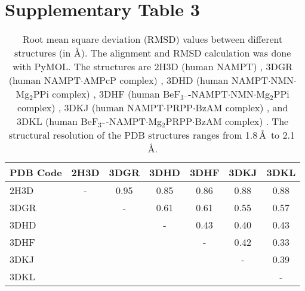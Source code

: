 \documentclass[a4paper,10pt]{article}
\begin{document}
\setcounter{table}{2}
\begin{table}
\section*{Supplementary Table 3}
 \begin{tabular}{l|cccccc}
  \toprule
  PDB Code & 2H3D & 3DGR & 3DHD & 3DHF & 3DKJ & 3DKL \\ 
  \midrule
  2H3D & - & 0.95 & 0.85 & 0.86 & 0.88 & 0.88 \\
  3DGR &   &  -   & 0.61 & 0.61 & 0.55 & 0.57 \\
  3DHD &   &      &  -   & 0.43 & 0.40 & 0.43 \\
  3DHF &   &      &      &  -   & 0.42 & 0.33 \\
  3DKJ &   &      &      &      &  -   & 0.39 \\
  3DKL &   &      &      &      &      &  -   \\
 \bottomrule
 \end{tabular}
  \caption{Root mean square deviation (RMSD) values between different structures (in \AA). The alignment and RMSD calculation was done with PyMOL\cite{PyMOL}. The structures are 2H3D (human NAMPT) \cite{Wang2006}, 3DGR (human NAMPT$\cdot$AMPcP complex) \cite{Burgos2009}, 3DHD (human NAMPT$\cdot$NMN$\cdot$Mg$_2$PPi complex) \cite{Burgos2009}, 3DHF (human BeF$_{3^-}$-NAMPT$\cdot$NMN$\cdot$Mg$_2$PPi complex) \cite{Burgos2009}, 3DKJ (human NAMPT$\cdot$PRPP$\cdot$BzAM complex) \cite{Burgos2009}, and 3DKL (human BeF$_{3^-}$-NAMPT$\cdot$Mg$_2$PRPP$\cdot$BzAM complex) \cite{Burgos2009}. The structural resolution of the PDB structures ranges from 1.8\,\AA~to 2.1\,\AA.}
\end{table}



\end{document}
